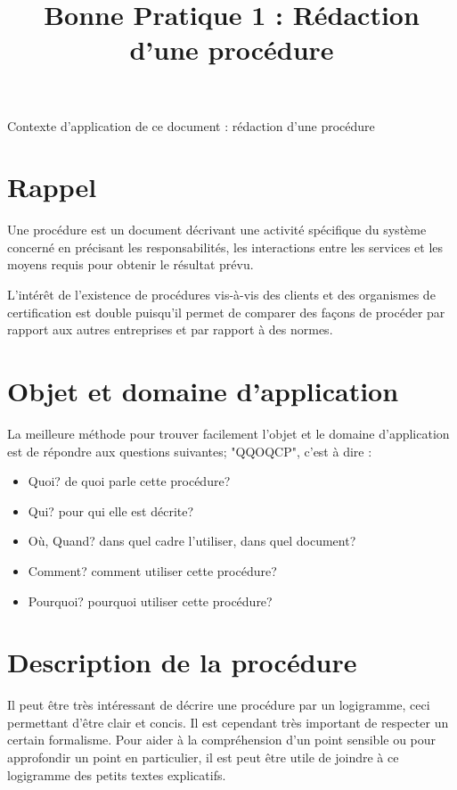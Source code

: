 \documentclass[a4paper]{article}
\begin{document}
\title{Bonne Pratique 1 : Rédaction d'une procédure}
\maketitle

Contexte d'application de ce document : rédaction d'une procédure

\section{Rappel}

Une procédure est un document décrivant une activité spécifique du système concerné en précisant les responsabilités, les interactions entre les services et les moyens requis pour obtenir le résultat prévu.

L'intérêt de l'existence de procédures vis-à-vis des clients et des organismes de certification est double puisqu'il permet de comparer des façons de procéder par rapport aux autres entreprises et par rapport à des normes.

\section{Objet et domaine d'application}

La meilleure méthode pour trouver facilement l'objet et le domaine d'application est de répondre aux questions suivantes; "QQOQCP", c'est à dire :

\begin{itemize}
\item Quoi? de quoi parle cette procédure?
\item Qui? pour qui elle est décrite?
\item Où, Quand? dans quel cadre l'utiliser, dans quel document?
\item Comment? comment utiliser cette procédure?
\item Pourquoi? pourquoi utiliser cette procédure?
\end{itemize}

\section{Description de la procédure}

Il peut être très intéressant de décrire une procédure par un logigramme, ceci permettant d'être clair et concis. Il est cependant très important de respecter un certain formalisme. Pour aider à la compréhension d'un point sensible ou pour approfondir un point en particulier, il est peut être utile de joindre à ce logigramme des petits textes explicatifs.
\end{document}
